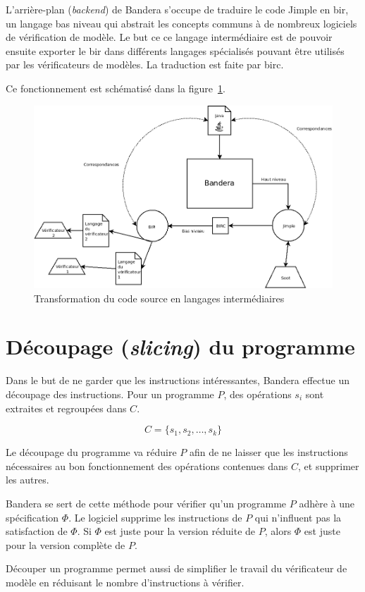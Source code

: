 L'arrière-plan (\textit{backend}) de Bandera s'occupe de traduire le
code Jimple en \gls{bir}, un langage bas niveau qui abstrait les
concepts communs à de nombreux logiciels de vérification de modèle. Le
but ce ce langage intermédiaire est de pouvoir ensuite exporter le
\gls{bir} dans différents langages spécialisés pouvant être utilisés
par les vérificateurs de modèles. La traduction est faite par
\gls{birc}.

Ce fonctionnement est schématisé dans la figure~\ref{fig:bir_jimple}.

\begin{figure}[ht]
  \centering
  \includegraphics[scale=0.5]{images/bandera_bir_jimple.png}
  \caption{\label{fig:bir_jimple} Transformation du code source en
    langages intermédiaires}
\end{figure}


\section{Découpage (\textit{slicing}) du programme}

Dans le but de ne garder que les instructions intéressantes, Bandera
effectue un découpage des instructions. Pour un programme $P$, des
opérations $s_i$ sont extraites et regroupées dans $C$.

$$C = \{s_1, s_2, \ldots, s_k\}$$

Le découpage du programme va réduire $P$ afin de ne laisser que les
instructions nécessaires au bon fonctionnement des opérations
contenues dans $C$, et supprimer les autres.

Bandera se sert de cette méthode pour vérifier qu'un programme $P$
adhère à une spécification $\Phi$. Le logiciel supprime les
instructions de $P$ qui n'influent pas la satisfaction de $\Phi$. Si
$\Phi$ est juste pour la version réduite de $P$, alors $\Phi$ est
juste pour la version complète de $P$.

Découper un programme permet aussi de simplifier le travail du
vérificateur de modèle en réduisant le nombre d'instructions à
vérifier.